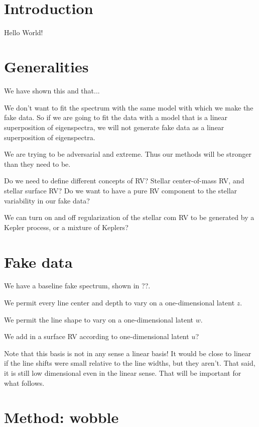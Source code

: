 \documentclass[modern]{aastex62}
\begin{document}
\section*{~}
\clearpage
\section{Introduction}

Hello World!

\section{Generalities}

We have shown this and that...

We don't want to fit the spectrum with the same model with which we make the fake data.
So if we are going to fit the data with a model that is a linear superposition of eigenspectra,
we will not generate fake data as a linear superposition of eigenspectra.

We are trying to be adversarial and extreme.
Thus our methods will be stronger than they need to be.

Do we need to define different concepts of RV?
Stellar center-of-mass RV, and stellar surface RV?
Do we want to have a pure RV component to the stellar variability in our fake data?

We can turn on and off regularization of the stellar com RV to be generated by a Kepler process,
or a mixture of Keplers?

\section{Fake data}

We have a baseline fake spectrum, shown in ??.

We permit every line center and depth to vary on a one-dimensional latent $z$.

We permit the line shape to vary on a one-dimensional latent $w$.

We add in a surface RV according to one-dimensional latent $u$?

Note that this basis is not in any sense a linear basis!
It would be close to linear if the line shifts were small relative to the line widths,
but they aren't.
That said, it is still low dimensional even in the linear sense.
That will be important for what follows.

\section{Method: wobble}
\end{document}
